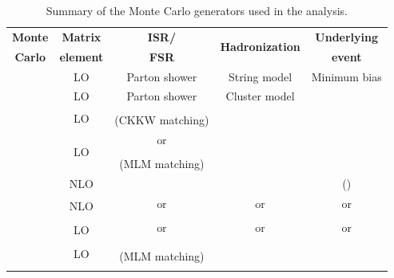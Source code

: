 \begin{table}[!ht]
  \begin{center}
    \begin{small}
      \setlength{\tabcolsep}{0.0pc}
      \begin{tabular*}{\textwidth}{@{\extracolsep{\fill}}ccccc}
        \noalign{\smallskip}\hline\hline\noalign{\smallskip}
        \textbf{Monte} & \textbf{Matrix}  & \textbf{ISR/} & \multirow{2}{*}{\textbf{Hadronization}} & \textbf{Underlying} \\
        \textbf{Carlo} & \textbf{element} & \textbf{FSR}  &                                         & \textbf{event} \\
        \noalign{\smallskip}\hline\noalign{\smallskip}
        \pythia{}      & LO               & Parton shower & String model  & Minimum bias \\
        \herwig{}      & LO               & Parton shower & Cluster model & \jimmy{}  \\
        \multirow{2}{*}{\sherpa{}}      & \multirow{2}{*}{LO}               & \pythia{}     & \multirow{2}{*}{\pythia{}}     & \multirow{2}{*}{\pythia{}} \\
         & & (CKKW matching)& & \\
        \multirow{3}{*}{\alpgen{}}      & \multirow{3}{*}{LO}               & \pythia{} or   & \multirow{3}{*}{\pythia{}}     & \multirow{3}{*}{\pythia{}} \\
         & & \herwig{}& & \\
         & & (MLM matching)& & \\
        \mcnlo{}       & NLO              & \herwig{} & \herwig{} & \herwig{} (\jimmy{})\\
        \multirow{2}{*}{\powheg{}}      & \multirow{2}{*}{NLO}               & \pythia{} or     & \pythia{} or     & \pythia{} or \\
         & & \herwig{} & \herwig{} & \herwig{} \\
        \multirow{2}{*}{\acer{}}      & \multirow{2}{*}{LO}               & \pythia{} or     & \pythia{} or     & \pythia{} or \\
         & & \herwig{} & \herwig{} & \herwig{} \\
        \multirow{2}{*}{\madgraph{}}      & \multirow{2}{*}{LO}               & \pythia{}     & \multirow{2}{*}{\pythia{}}    & \multirow{2}{*}{\pythia{}} \\
           & & (MLM matching) & &  \\
        \noalign{\smallskip}\hline\hline\noalign{\smallskip}
      \end{tabular*}
    \end{small}
  \end{center}
  \caption[Summary of the Monte Carlo generators used in the analysis.]{Summary of the Monte Carlo generators used in the analysis.}
  \label{tab:MCgenSummary}
\end{table}


